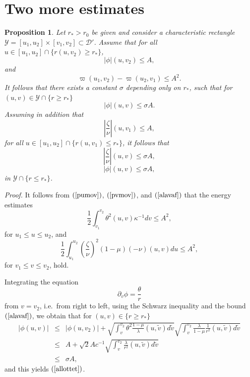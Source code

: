 \documentclass{article}
\newtheorem{proposition}{Proposition}[section]
\newcommand{\zn}{\frac{\zeta}{\nu}}
\begin{document}
\section{Two more estimates}
\label{akoma2sec}
\begin{proposition}
\label{piokovtaekei}
Let $r_*>r_0$ be given and consider a 
characteristic rectangle $\mathcal{Y}=[u_1,u_2]\times[v_1,v_2]\subset\mathcal{D}'$.
Assume
that for all $u\in[u_1,u_2]\cap\{r(u,v_2)\ge r_*\}$,
\begin{equation}
\label{alavaf}
|\phi|(u,v_2)\le A,
\end{equation}
and
\begin{equation}
\label{ekt-ev}
\varpi(u_1,v_2)-\varpi(u_2,v_1)\le A^2.
\end{equation}
It follows that there exists a constant $\sigma$ depending only on $r_*$,
such that for $(u,v)\in\mathcal{Y}\cap\{r\ge r_*\}$
\begin{equation}
\label{allottet}
|\phi|(u,v)\le\sigma A.
\end{equation}
Assuming in addition that 
\begin{equation}
\label{prosupo}
\left|\zn\right|(u,v_1)\le A,
\end{equation}
for all $u\in[u_1,u_2]\cap\{r(u,v_1)\le r_*\}$,
it follows that
\begin{equation}
\label{pros9apo1}
\left|\zn\right|(u,v)\le\sigma A,
\end{equation}
\begin{equation}
\label{pros9apo2}
|\phi|(u,v)\le\sigma A,
\end{equation}
in $\mathcal{Y}\cap\{r\le r_*\}$.
\end{proposition}

\noindent\emph{Proof.}
It follows from $(\ref{pumov})$, $(\ref{pvmov})$, and $(\ref{alavaf})$
that the energy estimates
\begin{equation}
\label{EnEs}
\frac12\int_{v_1}^{v_2}{\theta^2(u,v)\kappa^{-1} dv}\le A^2,
\end{equation}
for $u_1\le u\le u_2$, and
\[
\frac12\int_{u_1}^{u_2}{\left(\zn\right)^2(1-\mu)(-\nu)(u,v) du}\le A^2,
\]
for $v_1\le v\le v_2$,
hold.

Integrating the equation
\[
\partial_v\phi=\frac\theta{r}
\]
from $v=v_{2}$, i.e.~from right to left,
using the Schwarz inequality and the bound $(\ref{alavaf})$,
we obtain that for $(u,v)\in\{r\ge r_*\}$
\begin{eqnarray*}
|\phi(u,v)|	&\le&	|\phi(u,v_2)|+\sqrt{\int_v^{v_2}\theta^2
						\frac{1-\mu}{\lambda}(u,\tilde{v})
							d\tilde{v}}
					\sqrt{\int_v^{v_2}\frac{\lambda}{1-\mu}
						\frac{1}{r^2}(u,\tilde{v})d\tilde{v}}\\
		&\le&	A+
					\sqrt{2}Ac^{-1}
					\sqrt{\int_v^{v_2}\frac{\lambda}{r^2}(u,
						\tilde{v})d\tilde{v}}\\
		&\le&	\sigma A,
\end{eqnarray*}
and this yields $(\ref{allottet})$. 
\end{document}

